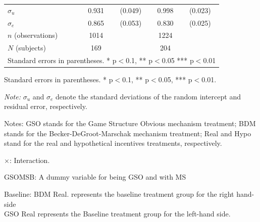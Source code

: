 \documentclass[12pt]{article}
\newcommand{\sym}[1]{\rlap{$^{#1}$}}
\begin{document}
\begin{table}[H]
{\begin{tabular}{l*{2}{cc}}
$\sigma_u$     &       0.931\sym{***}&     (0.049)&       0.998\sym{***}&     (0.023)\\
$\sigma_e$     &       0.865\sym{***}&     (0.053)&       0.830\sym{***}&     (0.025)\\
\(n\) (observations)       &        1014         &            &        1224         &            \\
\(N\) (subjects)      &        169         &            &        204         &            \\
\multicolumn{5}{l}{\footnotesize Standard errors in parentheses. * p$<$0.1, ** p$<$0.05 *** p$<$0.01}\\
\end{tabular}
}



\begin{tablenotes}
            \footnotesize
            \item Standard errors in parentheses. * p$<$0.1, ** p$<$0.05, *** p$<$0.01.
            \item \textit{Note:} $\sigma_u$ and $\sigma_e$ denote the standard deviations of the random intercept and residual error, respectively.
            \item Notes: GSO stands for the Game Structure Obvious mechanism treatment; BDM stands for the Becker-DeGroot-Marschak mechanism treatment; Real and Hypo stand for the real and hypothetical incentives treatments, respectively.
           \item $\times$: Interaction.
           \item GSOMSB: A dummy variable for being GSO and with MS
           \item Baseline: BDM Real. represents the baseline treatment group for the right hand-side \\
           GSO Real represents the Baseline treatment group for the left-hand side.
        \end{tablenotes}
\end{table}



\clearpage
\end{document}

